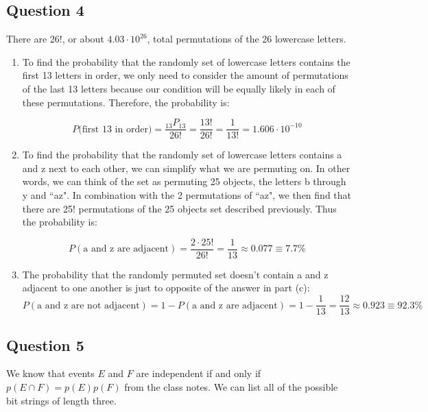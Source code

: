 \documentclass[letterpaper, 12pt]{article}
\begin{document}
\subsection*{Question 4}
There are 26!, or about $4.03 \cdot 10^{26}$, total permutations of the 26 lowercase letters.

\begin{enumerate}
    \item To find the probability that the randomly set of lowercase letters contains the first 13 letters in order, we only need to consider the amount of permutations of the last 13 letters because our condition will be equally likely in each of these permutations. Therefore, the probability is:
    
    \[P(\text{first 13 in order)} = \frac{_{13}P_{13}}{26!} = \frac{13!}{26!} = \frac{1}{13!} = 1.606 \cdot 10^{-10}\]
    
    \item To find the probability that the randomly set of lowercase letters contains a and z next to each other, we can simplify what we are permuting on. In other words, we can think of the set as permuting 25 objects, the letters b through y and ``az". In combination with the 2 permutations of ``az", we then find that there are 25! permutations of the 25 objects set described previously. Thus the probability is:
    
    \[P(\text{a and z are adjacent}) = \frac{2 \cdot 25!}{26!} = \frac{1}{13} \approx 0.077 \equiv 7.7\%\]
    
    \item The probability that the randomly permuted set doesn't contain a and z adjacent to one another is just to opposite of the answer in part (c):
    \[P(\text{a and z are not adjacent}) = 1 - P(\text{a and z are adjacent}) = 1 - \frac{1}{13} = \frac{12}{13} \approx 0.923 \equiv 92.3\%\]
\end{enumerate}

\subsection*{Question 5}
We know that events $E$ and $F$ are independent if and only if $p(E \cap F) = p(E)p(F)$ from the class notes. We can list all of the possible bit strings of length three.
\end{document}
